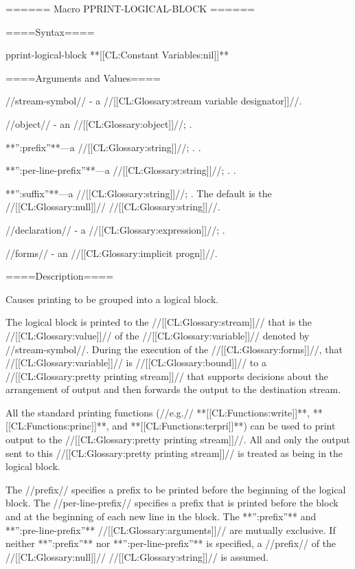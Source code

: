 ====== Macro PPRINT-LOGICAL-BLOCK ======

====Syntax====

\DefmacWithValuesNewline pprint-logical-block {} {**[[CL:Constant Variables:nil]]**}

====Arguments and Values====

//stream-symbol// - a //[[CL:Glossary:stream variable designator]]//.

//object// - an //[[CL:Glossary:object]]//; \eval.

**'':prefix''**---a //[[CL:Glossary:string]]//; \eval. \HairyDefault.

**'':per-line-prefix''**---a //[[CL:Glossary:string]]//; \eval. \HairyDefault.

**'':suffix''**---a //[[CL:Glossary:string]]//; \eval. The default is the //[[CL:Glossary:null]]// //[[CL:Glossary:string]]//.

//declaration// - a  //[[CL:Glossary:expression]]//; \noeval.

//forms// - an //[[CL:Glossary:implicit progn]]//.

====Description====

Causes printing to be grouped into a logical block.

The logical block is printed to the //[[CL:Glossary:stream]]// that is the //[[CL:Glossary:value]]// of the //[[CL:Glossary:variable]]// denoted by //stream-symbol//. During the execution of the //[[CL:Glossary:forms]]//, that //[[CL:Glossary:variable]]// is //[[CL:Glossary:bound]]// to a //[[CL:Glossary:pretty printing stream]]// that supports decisions about the arrangement of output and then forwards the output to the destination stream.

All the standard printing functions (//e.g.// **[[CL:Functions:write]]**, **[[CL:Functions:princ]]**, and **[[CL:Functions:terpri]]**) can be used to print output to the //[[CL:Glossary:pretty printing stream]]//. All and only the output sent to this //[[CL:Glossary:pretty printing stream]]// is treated as being in the logical block.

The //prefix// specifies a prefix to be printed before the beginning of the logical block. The //per-line-prefix// specifies a prefix that is printed before the block and at the beginning of each new line in the block. The **'':prefix''** and **'':pre-line-prefix''** //[[CL:Glossary:arguments]]// are mutually exclusive. If neither **'':prefix''** nor **'':per-line-prefix''** is specified, a //prefix// of the //[[CL:Glossary:null]]// //[[CL:Glossary:string]]// is assumed.

